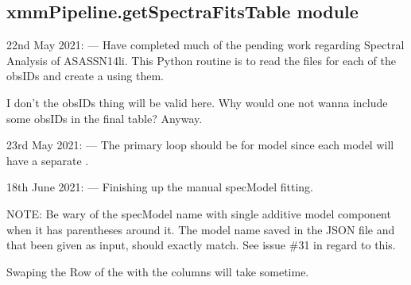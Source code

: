 \documentclass[letterpaper,10pt,english]{sphinxmanual}
\begin{document}
\begin{fulllineitems}
\label{\detokenize{xmmPipeline:xmmPipeline.findOverlap.imagePN_soft}}
\pysigstartsignatures
{}
\pysigstopsignatures
\end{fulllineitems}



\subsection{xmmPipeline.getSpectraFitsTable module}
\label{\detokenize{xmmPipeline:module-xmmPipeline.getSpectraFitsTable}}\label{\detokenize{xmmPipeline:xmmpipeline-getspectrafitstable-module}}
\sphinxAtStartPar
22nd May 2021:
—
Have completed much of the pending work regarding Spectral Analysis
of ASASSN\sphinxhyphen{}14li. This Python routine is to read the 
files for each of the obsIDs and create a  using them.

\sphinxAtStartPar
I don’t the obsIDs thing will be valid here.
Why would one not wanna include some obsIDs in the final table?
Anyway.

\sphinxAtStartPar
23rd May 2021:
—
The primary  loop should be for model since each model will have a
separate .

\sphinxAtStartPar
18th June 2021:
—
Finishing up the manual specModel fitting.

\sphinxAtStartPar
NOTE: Be wary of the specModel name with single additive model component
when it has parentheses around it. The model name saved in the JSON file
and that been given as input, should exactly match.
See issue \#31 in regard to this. 

\sphinxAtStartPar
Swaping the Row of the  with the columns will take sometime.

\begin{fulllineitems}
\label{\detokenize{xmmPipeline:xmmPipeline.getSpectraFitsTable.main}}
\pysigstartsignatures
{}
\pysigstopsignatures
\end{fulllineitems}
\end{document}
